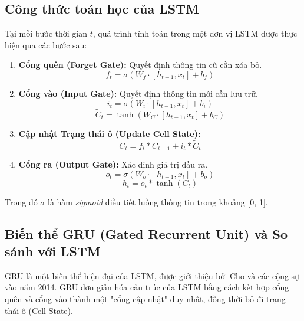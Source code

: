 \subsection{Công thức toán học của LSTM}
Tại mỗi bước thời gian $t$, quá trình tính toán trong một đơn vị LSTM được thực hiện qua các bước sau:

\begin{enumerate}
    \item \textbf{Cổng quên (Forget Gate):} Quyết định thông tin cũ cần xóa bỏ.
    \begin{equation}
        f_t = \sigma(W_f \cdot [h_{t-1}, x_t] + b_f)
    \end{equation}
    
    \item \textbf{Cổng vào (Input Gate):} Quyết định thông tin mới cần lưu trữ.
    \begin{equation}
        i_t = \sigma(W_i \cdot [h_{t-1}, x_t] + b_i)
    \end{equation}
    \begin{equation}
        \tilde{C}_t = \tanh(W_C \cdot [h_{t-1}, x_t] + b_C)
    \end{equation}
    
    \item \textbf{Cập nhật Trạng thái ô (Update Cell State):}
    \begin{equation}
        C_t = f_t * C_{t-1} + i_t * \tilde{C}_t
    \end{equation}
    
    \item \textbf{Cổng ra (Output Gate):} Xác định giá trị đầu ra.
    \begin{equation}
        o_t = \sigma(W_o \cdot [h_{t-1}, x_t] + b_o)
    \end{equation}
    \begin{equation}
        h_t = o_t * \tanh(C_t)
    \end{equation}
\end{enumerate}

Trong đó $\sigma$ là hàm \textit{sigmoid} điều tiết luồng thông tin trong khoảng [0, 1].

\subsection{Biến thể GRU (Gated Recurrent Unit) và So sánh với LSTM}
GRU là một biến thể hiện đại của LSTM, được giới thiệu bởi Cho và các cộng sự vào năm 2014. GRU đơn giản hóa cấu trúc của LSTM bằng cách kết hợp cổng quên và cổng vào thành một "cổng cập nhật" duy nhất, đồng thời bỏ đi trạng thái ô (Cell State).

